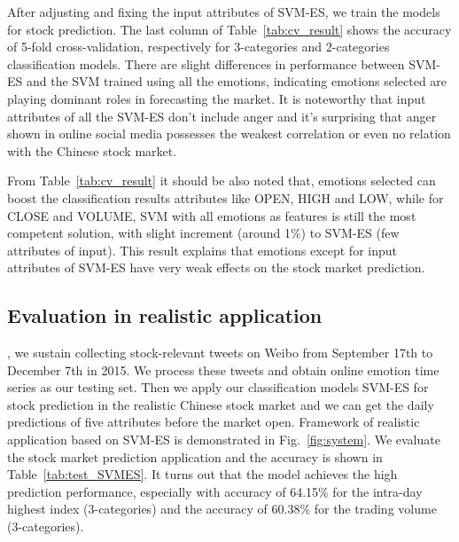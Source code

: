 \documentclass[aps,preprint,groupedaddress]{revtex4-1}
\begin{document}
After adjusting and fixing the input attributes of SVM-ES, we train the models for stock prediction. The last column of Table~\ref{tab:cv_result} shows the accuracy of 5-fold cross-validation, respectively for 3-categories and 2-categories classification models. There are slight differences in performance between SVM-ES and the SVM trained using all the emotions, indicating emotions selected are playing dominant roles in forecasting the market. It is noteworthy that input attributes of all the SVM-ES don't include anger and it's surprising that anger shown in online social media possesses the weakest correlation or even no relation with the Chinese stock market.

From Table~\ref{tab:cv_result} it should be also noted that, emotions selected can boost the classification results attributes like OPEN, HIGH and LOW, while for CLOSE and VOLUME, SVM with all emotions as features is still the most competent solution, with slight increment (around 1\%) to SVM-ES (few attributes of input). This result explains that emotions except for input attributes of SVM-ES have very weak effects on the stock market prediction.

\subsection{Evaluation in realistic application}
{\color{black}{To evaluate our prediction models}}, we sustain collecting stock-relevant tweets on Weibo from September 17th to December 7th in 2015. We process these tweets and obtain online emotion time series as our testing set. Then we apply our classification models SVM-ES for stock prediction in the realistic Chinese stock market and we can get the daily predictions of five attributes before the market open. Framework of realistic application based on SVM-ES is demonstrated in Fig.~\ref{fig:system}. We evaluate the stock market prediction application and the accuracy is shown in Table~\ref{tab:test_SVMES}. It turns out that the model achieves the high prediction performance, especially with accuracy of 64.15\% for the intra-day highest index (3-categories) and the accuracy of 60.38\% for the trading volume (3-categories).

{}
\end{document}
